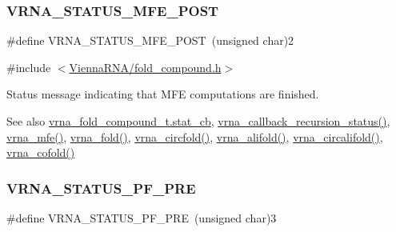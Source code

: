 \subsubsection{\texorpdfstring{V\+R\+N\+A\+\_\+\+S\+T\+A\+T\+U\+S\+\_\+\+M\+F\+E\+\_\+\+P\+O\+ST}{VRNA\_STATUS\_MFE\_POST}}
{\footnotesize\ttfamily \#define V\+R\+N\+A\+\_\+\+S\+T\+A\+T\+U\+S\+\_\+\+M\+F\+E\+\_\+\+P\+O\+ST~(unsigned char)2}



{\ttfamily \#include $<$\hyperlink{fold__compound_8h}{Vienna\+R\+N\+A/fold\+\_\+compound.\+h}$>$}



Status message indicating that M\+FE computations are finished. 

\begin{DoxySeeAlso}{See also}
\hyperlink{group__fold__compound_a87a83f6795b569000efcbe65acc3dd81}{vrna\+\_\+fold\+\_\+compound\+\_\+t.\+stat\+\_\+cb}, \hyperlink{group__fold__compound_gac86036fa8cad1108832335063243cdc8}{vrna\+\_\+callback\+\_\+recursion\+\_\+status()}, \hyperlink{group__mfe__fold_gabd3b147371ccf25c577f88bbbaf159fd}{vrna\+\_\+mfe()}, \hyperlink{group__mfe__fold__single_ga29a33b2895f4e67b0480271ff289afdc}{vrna\+\_\+fold()}, \hyperlink{group__mfe__fold__single_gaf973483d8acbc8cc9aacfc8a9b7f0074}{vrna\+\_\+circfold()}, \hyperlink{group__consensus__mfe__fold_ga6c9d3bef3e92c6d423ffac9f981418c1}{vrna\+\_\+alifold()}, \hyperlink{group__consensus__mfe__fold_ga17a1be7490468c29c335ba9bffacba53}{vrna\+\_\+circalifold()}, \hyperlink{group__mfe__cofold_ga9ef3a297201dbf838a8daff2b45c0c82}{vrna\+\_\+cofold()} 
\end{DoxySeeAlso}
\mbox{\label{group__fold__compound_ga91795d35ebdb6f32be50459f24b3d114}} 
\subsubsection{\texorpdfstring{V\+R\+N\+A\+\_\+\+S\+T\+A\+T\+U\+S\+\_\+\+P\+F\+\_\+\+P\+RE}{VRNA\_STATUS\_PF\_PRE}}
{\footnotesize\ttfamily \#define V\+R\+N\+A\+\_\+\+S\+T\+A\+T\+U\+S\+\_\+\+P\+F\+\_\+\+P\+RE~(unsigned char)3}



